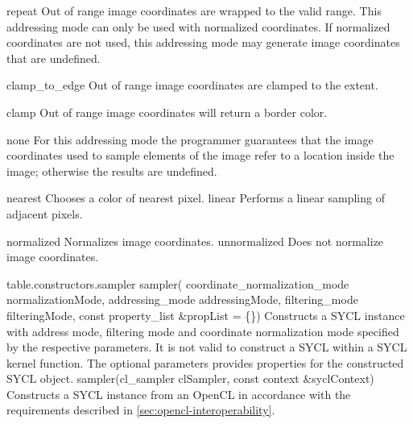   \addRow
  {repeat}
  {
    Out of range image coordinates are wrapped to the valid range. This addressing mode can only
    be used with normalized coordinates. If normalized coordinates are not used, this
    addressing mode may generate image coordinates that are undefined.
  }

  \addRow
  {clamp_to_edge}
  {
    Out of range image coordinates are clamped to the extent.
  }

  \addRow
  {clamp}
  {
    Out of range image coordinates will return a border color.
  }

  \addRow
  {none}
  {
    For this addressing mode the programmer guarantees that the image coordinates used to
    sample elements of the image refer to a location inside the image; otherwise the results are
    undefined.
  }
\completeTable

  \addRow
  {nearest}
  {
    Chooses a color of nearest pixel.
  }
  \addRow
  {linear}
  {
    Performs a linear sampling of adjacent pixels.
  }
\completeTable

  \addRow
  {normalized}
  {
    Normalizes image coordinates.
  }
  \addRow
  {unnormalized}
  {
    Does not normalize image coordinates.
  }
\completeTable

{table.constructors.sampler}
  \addRowFiveL
    {sampler(}
    {  coordinate_normalization_mode normalizationMode,}
    {  addressing_mode addressingMode,}
    {  filtering_mode filteringMode,}
    {  const property_list \&propList = \{\})}
    {
      Constructs a SYCL  instance with address mode, filtering mode and coordinate normalization mode specified by the respective parameters.
      It is not valid to construct a SYCL  within a SYCL kernel function.
      The optional  parameters provides properties for the constructed SYCL  object.
    }
  \addRowTwoL
    { sampler(cl_sampler clSampler, }
    { const context \&syclContext) }
    {  
      Constructs a SYCL  instance from an OpenCL  in accordance with the requirements described in \ref{sec:opencl-interoperability}.
    }
\completeTable

